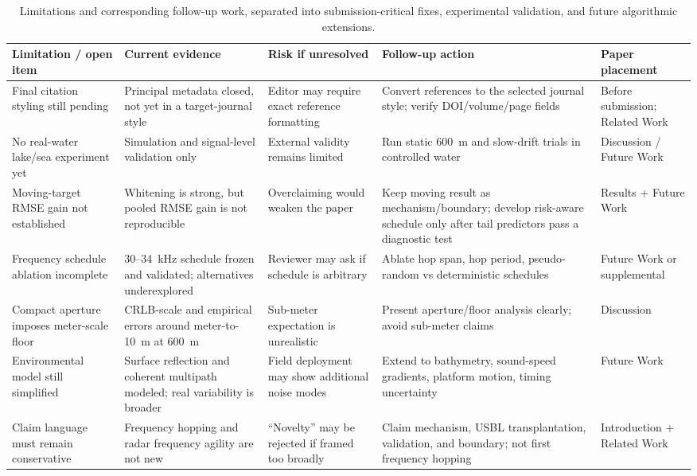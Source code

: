 \documentclass[journal]{IEEEtran}
\begin{document}
\begin{table}[!t]
\centering
\caption{Limitations and corresponding follow-up work, separated into submission-critical fixes,
experimental validation, and future algorithmic extensions.}
\label{tab:limitations}
\scriptsize
\setlength{\tabcolsep}{3.5pt}
\begin{tabularx}{\textwidth}{L L L L L}
\toprule
Limitation / open item & Current evidence & Risk if unresolved & Follow-up action & Paper
placement \\
\midrule
Final citation styling still pending & Principal metadata closed, not yet in a target-journal
style & Editor may require exact reference formatting & Convert references to the selected journal
style; verify DOI/volume/page fields & Before submission; Related Work \\
No real-water lake/sea experiment yet & Simulation and signal-level validation only & External
validity remains limited & Run static 600~m and slow-drift trials in controlled water & Discussion
/ Future Work \\
Moving-target RMSE gain not established & Whitening is strong, but pooled RMSE gain is not
reproducible & Overclaiming would weaken the paper & Keep moving result as mechanism/boundary;
develop risk-aware schedule only after tail predictors pass a diagnostic test & Results + Future
Work \\
Frequency schedule ablation incomplete & 30--34~kHz schedule frozen and validated; alternatives
underexplored & Reviewer may ask if schedule is arbitrary & Ablate hop span, hop period,
pseudo-random vs deterministic schedules & Future Work or supplemental \\
Compact aperture imposes meter-scale floor & CRLB-scale and empirical errors around meter-to-10~m
at 600~m & Sub-meter expectation is unrealistic & Present aperture/floor analysis clearly; avoid
sub-meter claims & Discussion \\
Environmental model still simplified & Surface reflection and coherent multipath modeled; real
variability is broader & Field deployment may show additional noise modes & Extend to bathymetry,
sound-speed gradients, platform motion, timing uncertainty & Future Work \\
Claim language must remain conservative & Frequency hopping and radar frequency agility are not new
& ``Novelty'' may be rejected if framed too broadly & Claim mechanism, USBL transplantation,
validation, and boundary; not first frequency hopping & Introduction + Related Work \\
\bottomrule
\end{tabularx}
\end{table}
\end{document}
